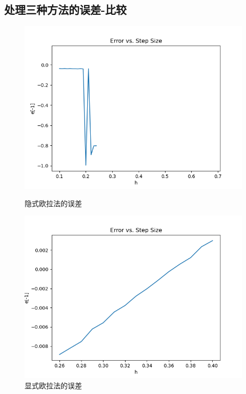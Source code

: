 \documentclass[12pt, a4paper, oneside]{ctexart}
\begin{document}
\begin{spacing}{2.0}
\section{处理三种方法的误差-比较}
\begin{figure}[H]
    \begin{minipage}[t]{0.5\linewidth}
        \centering
        \includegraphics[scale=0.3]{EIM-ddd.png}
        \caption{隐式欧拉法的误差}
        \label{fig:side:a}
      \end{minipage}%
      \begin{minipage}[t]{0.5\linewidth}
        \centering
        \includegraphics[scale=0.3]{EE-ddd.png}
        \caption{显式欧拉法的误差}
        \label{fig:side:b}
      \end{minipage}

\end{figure}
\end{spacing}
\end{document}
